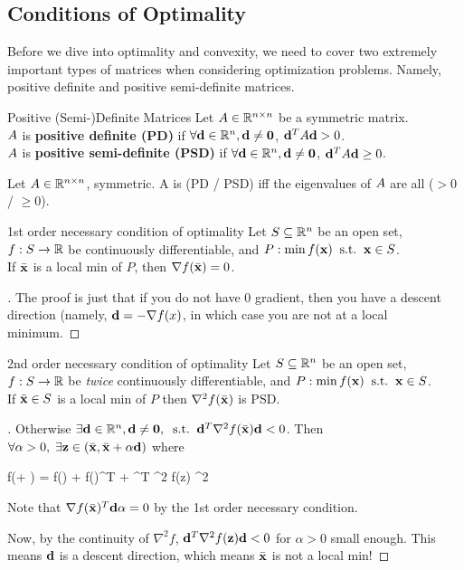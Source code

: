 \subsection{Conditions of Optimality}

Before we dive into optimality and convexity, we need to cover two extremely
important types of matrices when considering optimization problems. Namely, positive definite
and positive semi-definite matrices.

\begin{defn}{Positive (Semi-)Definite Matrices}{}
	Let $A \in \mathbb{R}^{n \times n}$ be a symmetric matrix.
	\bigskip\\
$A$ is \textbf{positive definite (PD)}
if $\forall \mathbf{d} \in \mathbb{R}^n, \mathbf{d} \neq \mathbf{0}$, $\mathbf{d}^TA\mathbf{d} > 0$.
\bigskip\\
$A$ is \textbf{positive semi-definite (PSD)}
if $\forall \mathbf{d} \in \mathbb{R}^n, \mathbf{d} \neq \mathbf{0}$, $\mathbf{d}^TA\mathbf{d} \geq 0$.
\end{defn}

\begin{theo}{}{}
Let $A \in \mathbb{R}^{n\times n}$, symmetric. 
A is (PD / PSD) iff the eigenvalues of $A$ are all ($> 0$ / $\geq 0$).
 \end{theo}


\begin{theo}{1st order necessary condition of optimality}{}
Let $S \subseteq \mathbb{R}^n$ be an open set, $f:S \rightarrow \mathbb{R}$ be continuously 
differentiable,
and $P : \min f(\mathbf{x}) \;\; \text{s.t.} \;\; \mathbf{x} \in S$.
\bigskip\\
If $\bar{\mathbf{x}}$ is a local min of $P$, then $\nabla f(\bar{\mathbf{x}}) = 0$.
\end{theo}

\begin{proof}[]
The proof is just that if you do not have 0 gradient, then you have a descent 
direction (namely, $\mathbf{d} = -\nabla f(x)$, in which case you are not at a local minimum.
\end{proof}

\begin{theo}{2nd order necessary condition of optimality}{}
Let $S \subseteq \mathbb{R}^n$ be an open set, $f:S \rightarrow \mathbb{R}$ be \textit{twice} 
continuously differentiable, and $P : \min f(\mathbf{x}) \;\; \text{s.t.} \;\; \mathbf{x} \in S$.
\bigskip\\
If $\bar{\mathbf{x}} \in S$ is a local min of $P$ then $\nabla^2 f(\bar{\mathbf{x}})$ is PSD.
\end{theo}

\begin{proof}[]
Otherwise $\exists \mathbf{d} \in \mathbb{R}^n, \mathbf{d} \neq \mathbf{0}, 
\;\; \text{s.t.} \;\; \mathbf{d}^T \nabla^2f(\bar{\mathbf{x}})\mathbf{d} < 0$. Then $\forall \alpha > 0, \; \exists \mathbf{z} 
\in (\bar{\mathbf{x}}, \bar{\mathbf{x}} + \alpha \mathbf{d})$ where 
\begin{frml}
	f(\bx + \alpha \vd) = f(\bx) + \nabla f(\bx)^T \vd \alpha + 
	\vd^T \nabla^2 f(z) \vd \alpha^2
\end{frml}
Note that $\nabla f(\bar{\mathbf{x}})^T \mathbf{d} \alpha = 0$ by the 1st order necessary condition.

Now, by the continuity of $\nabla^2 f$, $\mathbf{d}^T \nabla^2 f(\mathbf{z}) \mathbf{d} < 0$ for
$\alpha > 0$ small enough. This means $\mathbf{d}$ is a descent direction, which means
$\bar{\mathbf{x}}$ is not a local min!
\end{proof}

